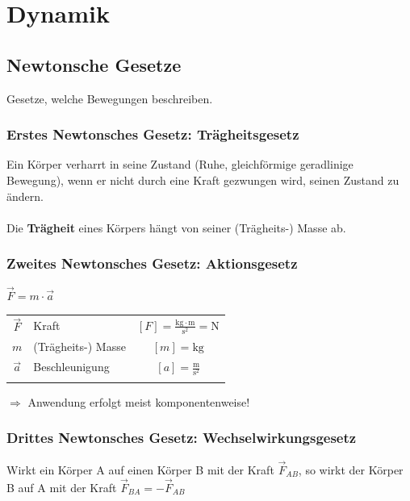 \section{Dynamik}
		
	\subsection{Newtonsche Gesetze}
	Gesetze, welche Bewegungen beschreiben.
		
		
	\subsubsection{Erstes Newtonsches Gesetz: Trägheitsgesetz}
	Ein Körper verharrt in seine Zustand (Ruhe, gleichförmige geradlinige Bewegung), wenn er nicht durch eine Kraft gezwungen wird, seinen Zustand zu ändern. \\
	\\
	Die \textbf{Trägheit} eines Körpers hängt von seiner (Trägheits-) Masse ab.
		
		
	\subsubsection{Zweites Newtonsches Gesetz: Aktionsgesetz}
		
	\begin{minipage}{0.2\linewidth}
	$\boxed {\vec{F} = m \cdot \vec{a} }$
	\end{minipage}
	\hfill
	\begin{minipage}{0.75\linewidth}
	\begin{tabular}{c l c}
	$\vec{F}$ & Kraft & $[F] = \mathrm{\frac{kg \cdot m}{s^2}  = N}$ \\
	$m$ & (Trägheits-) Masse & $[m] = \mathrm{kg}$ \\	
	$\vec{a}$ &  Beschleunigung & $[a] = \mathrm{\frac{m}{s^2}}$ \\
	\\
	\end{tabular}
	\end{minipage}
		
	$\Rightarrow$ Anwendung erfolgt meist komponentenweise!
		
		
	\subsubsection{Drittes Newtonsches Gesetz: Wechselwirkungsgesetz}
		
	Wirkt ein Körper A auf einen Körper B mit der Kraft $\vec{F}_{AB}$, so wirkt der Körper B auf A mit der Kraft $\vec{F}_{BA} = - \vec{F}_{AB}$ \\
	
